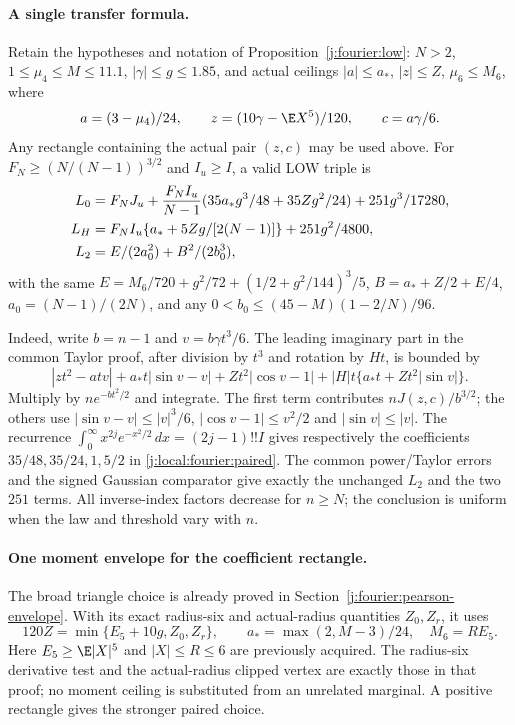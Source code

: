 \paragraph{A single transfer formula.}
Retain the hypotheses and notation of Proposition~\ref{j:fourier:low}:
$N>2$, $1\le\mu_4\le M\le11.1$, $|\gamma|\le g\le1.85$, and actual
ceilings $|a|\le a_*$, $|z|\le Z$, $\mu_6\le M_6$, where
\[
 a=(3-\mu_4)/24,\qquad z=(10\gamma-\E X^5)/120,
 \qquad c=a\gamma/6.
\]
Any rectangle containing the actual pair $(z,c)$ may be used above.
For $F_N\ge(N/(N-1))^{3/2}$ and $I_u\ge I$, a valid LOW triple is
\begin{align}\label{j:local:fourier:paired}
 L_0&=F_NJ_u+\frac{F_NI_u}{N-1}
       (35a_*g^3/48+35Zg^2/24)+251g^3/17280,\\
 L_H&=F_NI_u\{a_*+5Zg/[2(N-1)]\}+251g^2/4800,\notag\\
 L_2&=E/(2a_0^2)+B^2/(2b_0^3),\notag
\end{align}
with the same $E=M_6/720+g^2/72+(1/2+g^2/144)^3/5$,
$B=a_*+Z/2+E/4$, $a_0=(N-1)/(2N)$, and any
$0<b_0\le(45-M)(1-2/N)/96$.

Indeed, write $b=n-1$ and $v=b\gamma t^3/6$. The leading imaginary
part in the common Taylor proof, after division by $t^3$ and rotation
by $Ht$, is bounded by
\[
 |zt^2-atv|+a_*t|\sin v-v|+Zt^2|\cos v-1|
       +|H|t\{a_*t+Zt^2|\sin v|\}.
\]
Multiply by $ne^{-bt^2/2}$ and integrate. The first term contributes
$nJ(z,c)/b^{3/2}$; the others use
$|\sin v-v|\le|v|^3/6$, $|\cos v-1|\le v^2/2$ and
$|\sin v|\le|v|$. The recurrence
$\int_0^\infty x^{2j}e^{-x^2/2}\,dx=(2j-1)!!I$
gives respectively the coefficients $35/48,35/24,1,5/2$ in
\eqref{j:local:fourier:paired}. The common power/Taylor errors and
the signed Gaussian comparator give exactly the unchanged $L_2$ and
the two $251$ terms. All inverse-index factors decrease for $n\ge N$;
the conclusion is uniform when the law and threshold vary with $n$.

\paragraph{One moment envelope for the coefficient rectangle.}
The broad triangle choice is already proved in
Section~\ref{j:fourier:pearson-envelope}. With its exact radius-six
and actual-radius quantities $Z_0,Z_r$, it uses
\begin{equation}\label{j:local:fourier:z0}
 120Z=\min\{E_5+10g,Z_0,Z_r\},\qquad
 a_*=\max(2,M-3)/24,\quad M_6=RE_5.
\end{equation}
Here $E_5\ge\E|X|^5$ and $|X|\le R\le6$ are previously acquired.
The radius-six derivative test and the actual-radius clipped vertex
are exactly those in that proof; no moment ceiling is substituted
from an unrelated marginal. A positive rectangle gives the stronger
paired choice.

